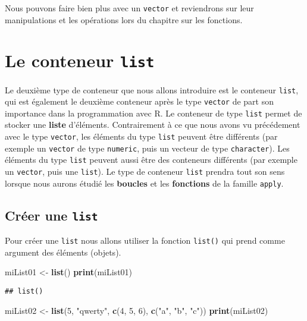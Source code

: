 \documentclass[]{book}
\newenvironment{Shaded}{\begin{snugshade}}{\end{snugshade}}
\newcommand{\KeywordTok}[1]{\textcolor[rgb]{0.13,0.29,0.53}{\textbf{#1}}}
\newcommand{\DecValTok}[1]{\textcolor[rgb]{0.00,0.00,0.81}{#1}}
\newcommand{\StringTok}[1]{\textcolor[rgb]{0.31,0.60,0.02}{#1}}
\newcommand{\NormalTok}[1]{#1}
\theoremstyle{definition}
\theoremstyle{definition}
\theoremstyle{definition}
\theoremstyle{remark}
\begin{document}
Nous pouvons faire bien plus avec un \texttt{vector} et reviendrons sur
leur manipulations et les opérations lors du chapitre sur les fonctions.

\hypertarget{l014list}{\section{\texorpdfstring{Le conteneur
\texttt{list}}{Le conteneur list}}\label{l014list}}

Le deuxième type de conteneur que nous allons introduire est le
conteneur \texttt{list}, qui est également le deuxième conteneur après
le type \texttt{vector} de part son importance dans la programmation
avec R. Le conteneur de type \texttt{list} permet de stocker une
\textbf{liste} d'éléments. Contrairement à ce que nous avons vu
précédement avec le type \texttt{vector}, les éléments du type
\texttt{list} peuvent être différents (par exemple un \texttt{vector} de
type \texttt{numeric}, puis un vecteur de type \texttt{character}). Les
éléments du type \texttt{list} peuvent aussi être des conteneurs
différents (par exemple un \texttt{vector}, puis une \texttt{list}). Le
type de conteneur \texttt{list} prendra tout son sens lorsque nous
aurons étudié les \textbf{boucles} et les \textbf{fonctions} de la
famille \texttt{apply}.

\subsection{\texorpdfstring{Créer une
\texttt{list}}{Créer une list}}\label{creer-une-list}

Pour créer une \texttt{list} nous allons utiliser la fonction
\texttt{list()} qui prend comme argument des éléments (objets).

\begin{Shaded}
\begin{Highlighting}[]
\NormalTok{miList01 <-}\StringTok{ }\KeywordTok{list}\NormalTok{()}
\KeywordTok{print}\NormalTok{(miList01)}
\end{Highlighting}
\end{Shaded}

\begin{verbatim}
## list()
\end{verbatim}

\begin{Shaded}
\begin{Highlighting}[]
\NormalTok{miList02 <-}\StringTok{ }\KeywordTok{list}\NormalTok{(}\DecValTok{5}\NormalTok{, }\StringTok{"qwerty"}\NormalTok{, }\KeywordTok{c}\NormalTok{(}\DecValTok{4}\NormalTok{, }\DecValTok{5}\NormalTok{, }\DecValTok{6}\NormalTok{), }\KeywordTok{c}\NormalTok{(}\StringTok{"a"}\NormalTok{, }\StringTok{"b"}\NormalTok{, }\StringTok{"c"}\NormalTok{))}
\KeywordTok{print}\NormalTok{(miList02)}
\end{Highlighting}
\end{Shaded}
\end{document}
